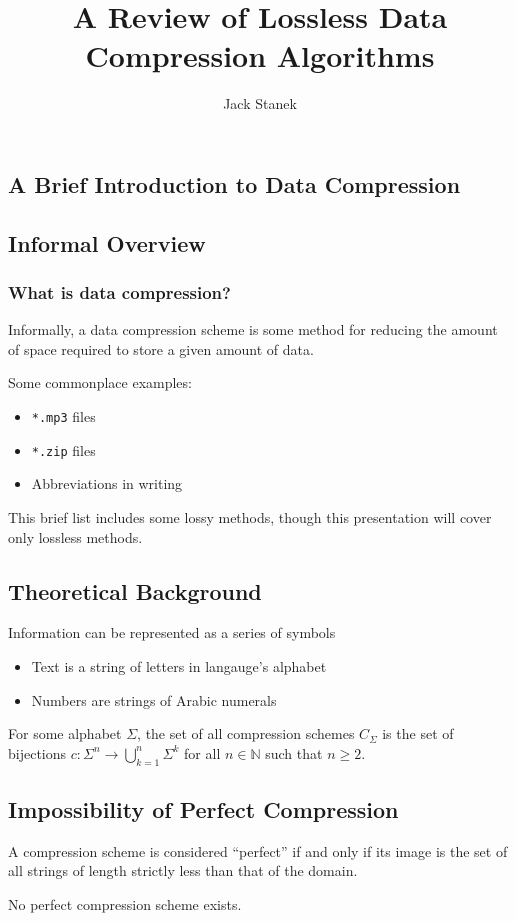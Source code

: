 \documentclass[mathserif,notheorems]{beamer} %
\title{A Review of Lossless Data Compression Algorithms}
\author{Jack Stanek}
\begin{document}
\begin{frame}
  \titlepage
\end{frame}

\begin{frame}
  \tableofcontents
\end{frame}

\begin{frame}
  \section{A Brief Introduction to Data Compression}
  \subsection{Informal Overview}
  \frametitle{What is data compression?}

  Informally, a data compression scheme is some method for reducing
  the amount of space required to store a given amount of data.

  Some commonplace examples:

  \begin{itemize}
  \item \texttt{*.mp3} files
  \item \texttt{*.zip} files
  \item Abbreviations in writing
  \end{itemize}

  This brief list includes some lossy methods, though this
  presentation will cover only lossless methods.
\end{frame}

\begin{frame}
  \subsection{Theoretical Background}
  Information can be represented as a series of symbols
  \begin{itemize}
  \item Text is a string of letters in langauge's alphabet
  \item Numbers are strings of Arabic numerals
  \end{itemize}
  For some alphabet $\Sigma$, the set of all compression schemes
  $C_\Sigma$ is the set of bijections
  $c : \Sigma^n \to \bigcup_{k = 1}^{n} \Sigma^k$ for all
  $n \in \mathbb{N}$ such that $n \geq 2$.
\end{frame}

\begin{frame}
  \subsection{Impossibility of Perfect Compression}
  A compression scheme is considered ``perfect'' if and only if its
  image is the set of all strings of length strictly less than that of
  the domain.
  \begin{Theorem}
    No perfect compression scheme exists.
  \end{Theorem}
\end{frame}
\end{document}

